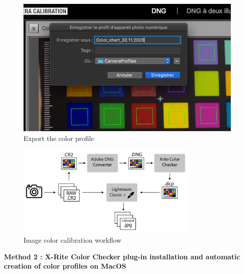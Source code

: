 \documentclass[
]{book}
\theoremstyle{definition}
\theoremstyle{definition}
\theoremstyle{definition}
\theoremstyle{definition}
\theoremstyle{remark}
\begin{document}
\begin{figure}
\hypertarget{color_checker_profile}{%
\centering
\includegraphics[width=1\textwidth,height=\textheight]{Figures/create profile.png}
\caption{Export the color
profile}\label{color_checker_profile}
}
\end{figure}

\begin{figure}
\hypertarget{fig:workflow}{%
\centering
\includegraphics[width=0.8\textwidth,height=\textheight]{Figures/manual_method.png}
\caption{Image color calibration
workflow}\label{fig:workflow}
}
\end{figure}

\textbf{Method 2 : X-Rite Color Checker plug-in installation and automatic
creation of color profiles on MacOS}
\end{document}
